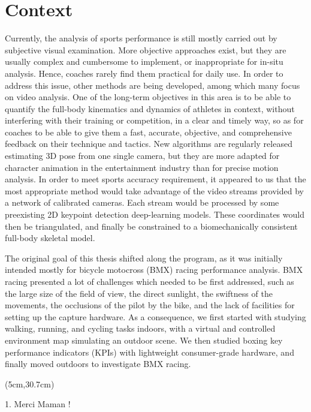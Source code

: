 \section*{Context}

Currently, the analysis of sports performance is still mostly carried out by subjective visual examination. More objective approaches exist, but they are usually complex and cumbersome to implement, or inappropriate for in-situ analysis. Hence, coaches rarely find them practical for daily use. In order to address this issue, other methods are being developed, among which many focus on video analysis. One of the long-term objectives in this area is to be able to quantify the full-body kinematics and dynamics of athletes in context, without interfering with their training or competition, in a clear and timely way, so as for coaches to be able to give them a fast, accurate, objective, and comprehensive feedback on their technique and tactics. New algorithms are regularly released estimating 3D pose from one single camera, but they are more adapted for character animation in the entertainment industry than for precise motion analysis. In order to meet sports accuracy requirement, it appeared to us that the most appropriate method would take advantage of the video streams provided by a network of calibrated cameras. Each stream would be processed by some preexisting 2D keypoint detection deep-learning models. These coordinates would then be triangulated, and finally be constrained to a biomechanically consistent full-body skeletal model. 

The original goal of this thesis shifted along the program, as it was initially intended mostly for bicycle motocross (BMX) racing performance analysis. BMX racing presented a lot of challenges which needed to be first addressed, such as the large size of the field of view, the direct sunlight, the swiftness of the movements, the occlusions of the pilot by the bike, and the lack of facilities for setting up the capture hardware. As a consequence, we first started with studying walking, running, and cycling tasks indoors, with a virtual and controlled environment map simulating an outdoor scene. We then studied boxing key performance indicators (KPIs) with lightweight consumer-grade hardware, and finally moved outdoors to investigate BMX racing.


\begin{textblock*}{10cm}(5cm,30.7cm) %
      \begin{turn}{0}  
            \scriptsize \emojiegg
            \tiny 1. Merci Maman ! 
            \scriptsize \emojimedal
      \end{turn}
\end{textblock*}


